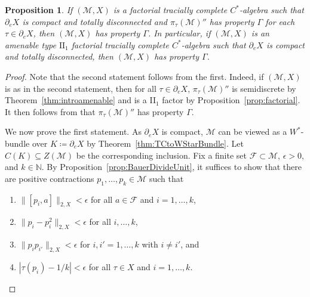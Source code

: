 \documentclass[a4paper,11pt]{amsart}
\newtheorem{proposition}[theorem]{Proposition}
\theoremstyle{definition}
\numberwithin{equation}{section}
\numberwithin{theorem}{section}
\begin{document}
\begin{proposition}\label{prop:zerodimgamma}
    If $(\mathcal M, X)$ is a factorial tracially complete $C^*$-algebra such that $\partial_eX$ is compact and totally disconnected and $\pi_\tau(\mathcal M)''$ has property $\Gamma$ for each $\tau \in \partial_eX$, then $(\mathcal M, X)$ has property $\Gamma$.  In particular, if $(\mathcal M, X)$ is an amenable type $\mathrm{II}_1$ factorial tracially complete $C^*$-algebra such that $\partial_e X$ is compact and totally disconnected, then $(\mathcal M, X)$ has property $\Gamma$.
\end{proposition}

\begin{proof}
   Note that the second statement follows from the first.  Indeed, if $(\mathcal M, X)$ is as in the second statement, then for all $\tau \in \partial_e X$, $\pi_\tau(\mathcal M)''$ is semidiscrete by Theorem~\ref{thm:introamenable} and is a II$_1$ factor by Proposition~\ref{prop:factorial}.  It then follows from \cite[Corollary 2.2]{Co76} that $\pi_\tau(\mathcal M)''$ has property $\Gamma$.

   We now prove the first statement.  As $\partial_e X$ is compact, $\mathcal M$ can be viewed as a $W^*$-bundle over $K \coloneqq \partial_e X$ by Theorem~\ref{thm:TCtoWStarBundle}.  Let $C(K) \subseteq Z(\mathcal M)$ be the corresponding inclusion.  Fix a finite set $\mathcal F \subset \mathcal M$, $\epsilon > 0$, and $k \in \mathbb N$.  By Proposition~\ref{prop:BauerDivideUnit}, it suffices to show that there are positive contractions $p_1, \ldots, p_k \in \mathcal M$ such that
   \begin{enumerate}
       \item\label{zdb1} $\|[p_i, a]\|_{2, X} < \epsilon$ for all $a \in \mathcal F$ and $i = 1, \ldots, k$,
       \item\label{zdb2} $\|p_i - p_i^2\|_{2, X} < \epsilon$ for all $i, \ldots, k$,
       \item\label{zdb3} $\|p_i p_{i'}\|_{2, X} < \epsilon$ for $i, i' = 1,\ldots,k$ with $i \neq i'$, and
       \item\label{zdb4} $|\tau(p_i) - 1/k| < \epsilon$ for all $\tau \in X$ and $i = 1, \ldots, k$.
   \end{enumerate}


\end{proof}
\end{document}
